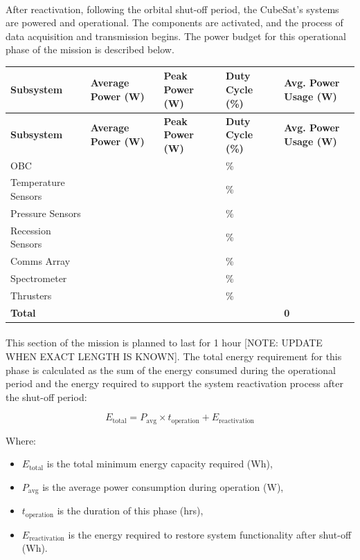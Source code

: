 \documentclass[11pt]{article}
\begin{document}
	\paragraph{}After reactivation, following the orbital shut-off period, the CubeSat's systems are powered and operational. The components are activated, and the process of data acquisition and transmission begins. The power budget for this operational phase of the mission is described below.
	
	\begin{longtable}{|p{3cm}|p{2cm}|p{2cm}|p{2cm}|p{3cm}|}
		\hline
		\textbf{Subsystem} & \textbf{Average Power (W)} & \textbf{Peak Power (W)} & \textbf{Duty Cycle (\%)} & \textbf{Avg. Power Usage (W)} \\
		\hline
		\endfirsthead
		
		\hline
		\textbf{Subsystem} & \textbf{Average Power (W)} & \textbf{Peak Power (W)} & \textbf{Duty Cycle (\%)} & \textbf{Avg. Power Usage (W)} \\
		\hline
		\endhead
		
		\hline
		\endfoot
		
		OBC &  &  & \% &  \\
		Temperature Sensors &  &  & \% &  \\
		Pressure Sensors &  &  & \% &  \\
		Recession Sensors &  &  & \% &  \\
		Comms Array &  &  & \% &  \\
		Spectrometer &  &  & \% &  \\
		Thrusters &  &  & \% &  \\
		\hline
		\textbf{Total} &  &  & & \textbf{0} \\
		\hline
		
	\end{longtable}
	
	\paragraph{}This section of the mission is planned to last for 1 hour [NOTE: UPDATE WHEN EXACT LENGTH IS KNOWN]. The total energy requirement for this phase is calculated as the sum of the energy consumed during the operational period and the energy required to support the system reactivation process after the shut-off period:
	
	\[
	E_{\text{total}} = P_{\text{avg}} \times t_{\text{operation}} + E_{\text{reactivation}}
	\]
	
	\noindent
	Where:  
	\begin{itemize}
		\item $E_{\text{total}}$ is the total minimum energy capacity required (Wh),
		\item $P_{\text{avg}}$ is the average power consumption during operation (W),
		\item $t_{\text{operation}}$ is the duration of this phase (hrs),
		\item $E_{\text{reactivation}}$ is the energy required to restore system functionality after shut-off (Wh).
	\end{itemize}
	
\end{document}

